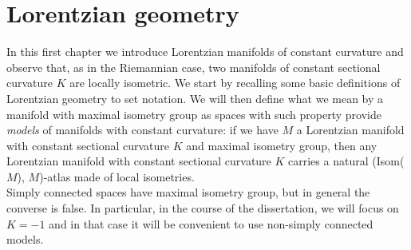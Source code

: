 \chapter{Lorentzian geometry}
In this first chapter we introduce Lorentzian manifolds of constant curvature and observe that, as in the Riemannian case, two manifolds of constant sectional curvature $K$ are locally isometric. We start by recalling some basic definitions of Lorentzian geometry to set notation. We will then define what we mean by a manifold with maximal isometry group as spaces with such property provide \textit{models} of manifolds with constant curvature: if we have $M$ a Lorentzian manifold with constant sectional curvature $K$ and maximal isometry group, then any Lorentzian manifold with constant sectional curvature $K$ carries a natural (Isom($M$), $M$)-atlas made of local isometries. \\
Simply connected spaces have maximal isometry group, but in general the converse is false. In particular, in the course of the dissertation, we will focus on $K=-1$ and in that case it will be convenient to use non-simply connected models. 

